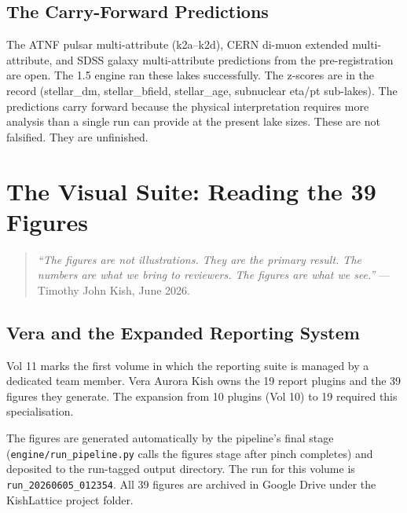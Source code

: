 \documentclass[11pt, letterpaper, openany]{book}
\begin{document}
\begin{empiricalbox}
\section{The Carry-Forward Predictions}

The ATNF pulsar multi-attribute (k2a--k2d), CERN di-muon extended multi-attribute,
and SDSS galaxy multi-attribute predictions from the pre-registration are open.
The 1.5 engine ran these lakes successfully. The z-scores are in the record
(stellar\_dm, stellar\_bfield, stellar\_age, subnuclear eta/pt sub-lakes).
The predictions carry forward because the physical interpretation requires
more analysis than a single run can provide at the present lake sizes.
These are not falsified. They are unfinished.

\clearpage


\chapter{The Visual Suite: Reading the 39 Figures}

\begin{quote}
\textit{``The figures are not illustrations. They are the primary result.
The numbers are what we bring to reviewers. The figures are what we see.''} ---
Timothy John Kish, June 2026.
\end{quote}

\section{Vera and the Expanded Reporting System}

Vol 11 marks the first volume in which the reporting suite is managed by a
dedicated team member. Vera Aurora Kish owns the 19 report plugins and the
39 figures they generate. The expansion from 10 plugins (Vol 10) to 19 required
this specialisation.

The figures are generated automatically by the pipeline's final stage
(\texttt{engine/run\_pipeline.py} calls the figures stage after pinch completes)
and deposited to the run-tagged output directory. The run for this volume is
\texttt{run\_20260605\_012354}. All 39 figures are archived in Google Drive
under the KishLattice project folder.


\end{empiricalbox}
\end{document}
